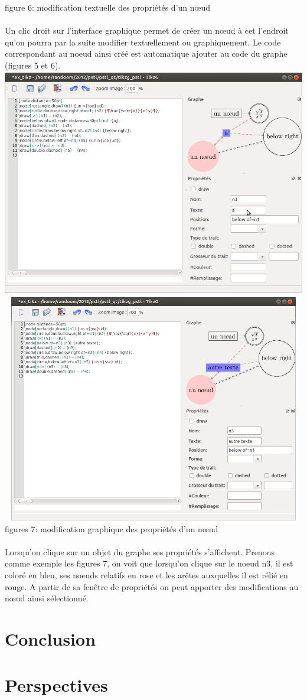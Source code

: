\documentclass[a4paper]{report}
\begin{document}
figure 6: modification textuelle des propriétés d'un n{\oe}ud
\\
\\
Un clic droit sur l'interface graphique permet de créer un n{\oe}ud à cet l'endroit qu'on pourra par la suite modifier textuellement ou graphiquement. Le code correspondant au noeud ainsi créé est automatique ajouter au code du graphe (figures 5 et 6). 
\newline
  \includegraphics[width=15cm, height=10cm]{img/r_8.png} 
\\
  \includegraphics[width=15cm, height=10cm]{img/r_9.png}
\\ 
figures 7: modification graphique des propriétés d'un n{\oe}ud
\\
\\
Lorsqu'on clique sur un objet du graphe ses propriétés s'affichent. Prenons comme exemple les figures 7, on voit que lorsqu'on clique sur le noeud n3, il est coloré en bleu, ses noeuds relatifs en rose et les arêtes auxquelles il est rélié en rouge. A partir de sa fenêtre de propriétés on peut apporter des modifications au n{\oe}ud ainsi sélectionné. 
\chapter{Conclusion}
\chapter{Perspectives}
   
\end{document}
